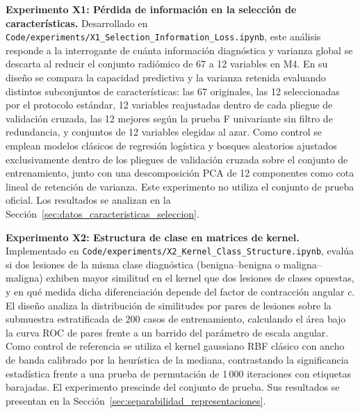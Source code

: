 \textbf{Experimento X1: Pérdida de información en la selección de características.} Desarrollado en
\texttt{Code/}\allowbreak\texttt{experiments/}\allowbreak\texttt{X1\_Selection\_Information\_Loss.ipynb}, este análisis responde a la
interrogante de cuánta información diagnóstica y varianza global se descarta al reducir el conjunto radiómico de 67 a 12
variables en M4. En su diseño se compara la capacidad predictiva y la varianza retenida evaluando distintos subconjuntos
de características: las 67 originales, las 12 seleccionadas por el protocolo estándar, 12 variables reajustadas dentro de
cada pliegue de validación cruzada, las 12 mejores según la prueba F univariante sin filtro de redundancia, y conjuntos de
12 variables elegidas al azar. Como control se emplean modelos clásicos de regresión logística y bosques aleatorios ajustados
exclusivamente dentro de los pliegues de validación cruzada sobre el conjunto de entrenamiento, junto con una descomposición
PCA de 12 componentes como cota lineal de retención de varianza. Este experimento no utiliza el conjunto de prueba oficial.
Los resultados se analizan en la Sección~\ref{sec:datos_caracteristicas_seleccion}.

\textbf{Experimento X2: Estructura de clase en matrices de kernel.} Implementado en
\texttt{Code/}\allowbreak\texttt{experiments/}\allowbreak\texttt{X2\_Kernel\_Class\_Structure.ipynb}, evalúa si dos lesiones de la misma
clase diagnóstica (benigna--benigna o maligna--maligna) exhiben mayor similitud en el kernel que dos lesiones de clases opuestas,
y en qué medida dicha diferenciación depende del factor de contracción angular $c$. El diseño analiza la distribución de
similitudes por pares de lesiones sobre la submuestra estratificada de 200 casos de entrenamiento, calculando el área
bajo la curva ROC de pares frente a un barrido del parámetro de escala angular. Como control de referencia se utiliza el kernel
gaussiano RBF clásico con ancho de banda calibrado por la heurística de la mediana, contrastando la significancia estadística
frente a una prueba de permutación de 1\,000 iteraciones con etiquetas barajadas. El experimento prescinde del conjunto de prueba.
Sus resultados se presentan en la Sección~\ref{sec:separabilidad_representaciones}.

